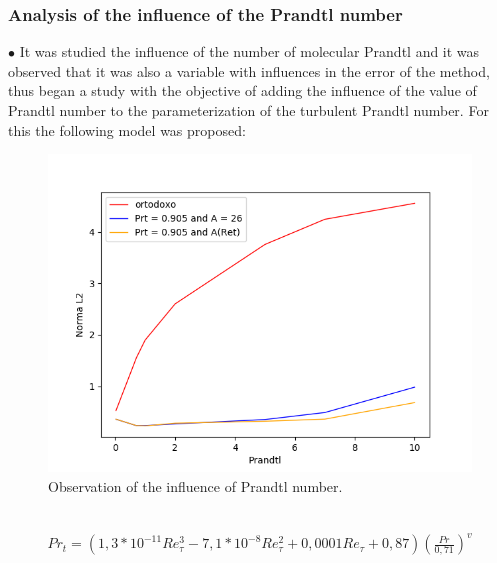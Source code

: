 \documentclass[xcolor=dvipsnames,8pt,aspectratio=34]{beamer}
\begin{document}
		\begin{frame}
		\frametitle{Analysis of the influence of the Prandtl number}
		\begin{minipage}[h!]{0.45\textwidth}
			$\bullet$ It was studied the influence of the number of molecular Prandtl and it was observed that it was also a variable with influences in the error of the method, thus began a study with the objective of adding the influence of the value of Prandtl number to the parameterization of the turbulent Prandtl number. For this the following model was proposed:
		\end{minipage}
		\begin{minipage}[h!]{0.45\textwidth}
			\begin{figure}
				\centering
				\includegraphics[angle=0, scale=0.42]{analisepr}
				\caption{Observation of the influence of Prandtl number.}
			\end{figure}
		\end{minipage}\\
		\begin{equation}
		\begin{split}
		Pr_t = \left( 1,3 * 10^{-11} Re_\tau^3 - 7,1 * 10^{-8} Re_\tau^2 + 0,0001 Re_\tau + 0,87 \right) \left(  \frac{Pr}{0,71}\right) ^{v}
		\end{split}
		\end{equation}
		\end{frame}
		
		
		
		
		
\end{document}

